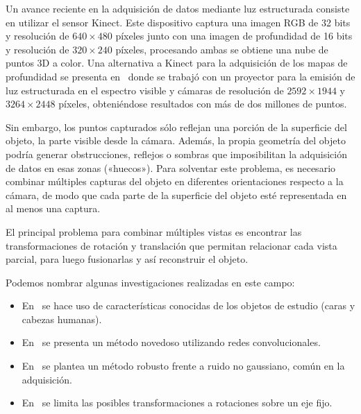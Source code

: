 	Un avance reciente en la adquisición de datos mediante luz estructurada consiste en utilizar el sensor Kinect.
	Este dispositivo captura una imagen RGB de 32 bits y resolución de $640 \times 480$ píxeles
	junto con una imagen de profundidad de 16 bits y resolución de $320 \times 240$ píxeles\cite{MatheEstudioKinect}, %
	procesando ambas se obtiene una nube de puntos 3D a color. %
	Una alternativa a Kinect para la adquisición de los mapas de profundidad se presenta en~\cite{Pancho}
	donde se trabajó con un proyector para la emisión de luz estructurada en el espectro visible y cámaras de resolución de $2592 \times 1944$ y $3264 \times 2448$ píxeles,
	obteniéndose resultados con más de dos millones de puntos.

	Sin embargo, los puntos capturados sólo reflejan una porción de la superficie del objeto,
	la parte visible desde la cámara.
	Además, la propia geometría del objeto podría generar obstrucciones, reflejos o sombras
	que imposibilitan la adquisición de datos en esas zonas («huecos»).
	Para solventar este problema, es necesario combinar múltiples capturas
	del objeto en diferentes orientaciones respecto a la cámara, de modo que
	cada parte de la superficie del objeto esté representada en al menos una captura.

	El principal problema para combinar múltiples vistas es
	encontrar las transformaciones de rotación y translación que permitan
	relacionar cada vista parcial, para luego fusionarlas y así reconstruir el objeto.

	Podemos nombrar algunas investigaciones realizadas en este campo:
	\begin{itemize}
		\item En~\cite{Hassanpour} %
	se hace uso de características conocidas de los objetos de estudio (caras y cabezas humanas).
		\item En~\cite{Riegler2017THREEDV} %
	se presenta un método novedoso utilizando redes convolucionales.
		\item En~\cite{Zach08fastand} %
	se plantea un método robusto frente a ruido no gaussiano, común en la adquisición.
		\item En~\cite{automatic-3d-model-construction-for-turn-table-sequences} %
	se limita las posibles transformaciones a rotaciones sobre un eje fijo.
	\end{itemize}

